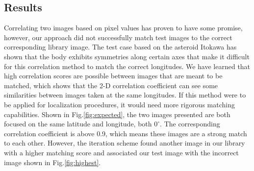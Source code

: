 \subsection{Results}
Correlating two images based on pixel values has proven to have some promise, however, our approach did not successfully match test images to the correct corresponding library image. The test case based on the asteroid Itokawa has shown that the body exhibits symmetries along certain axes that make it difficult for this correlation method to match the correct longitudes. We have learned that high correlation scores are possible between images that are meant to be matched, which shows that the 2-D correlation coefficient can see some similarities between images taken at the same longitudes. If this method were to be applied for localization procedures, it would need more rigorous matching capabilities. Shown in Fig.\ref{fig:expected}, the two images presented are both focused on the same latitude and longitude, both $0^{\circ}$. The corresponding correlation coefficient is above 0.9, which means these images are a strong match to each other. However, the iteration scheme found another image in our library with a higher matching score and associated our test image with the incorrect image shown in Fig.\ref{fig:highest}. 

